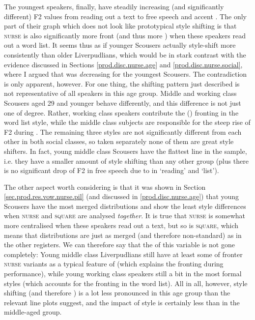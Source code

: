 The youngest speakers, finally, have steadily increasing (and significantly different) F2 values from reading out a text to free speech and accent .
The only part of their graph which does not look like prototypical style shifting is that \textsc{nurse} is also significantly more front (and thus more ) when these speakers read out a word list.
It seems thus as if younger Scousers actually style-shift more consistently than older Liverpudlians, which would be in stark contrast with the evidence discussed in Sections \ref{prod.disc.nurse.age} and \ref{prod.disc.nurse.social}, where I argued that  was \emph{de}creasing for the youngest Scousers.
The contradiction is only apparent, however.
For one thing, the shifting pattern just described is not representative of all speakers in this age group.
Middle and working class Scousers aged 29 and younger behave differently, and this difference is not just one of degree.
Rather, working class speakers contribute the () fronting in the word list style, while the middle class subjects are responsible for the steep rise of F2 during .
The remaining three styles are not significantly different from each other in both social classes, so taken separately none of them are great style shifters.
In fact, young middle class Scousers have the flattest line in the sample, i.e. they have a smaller amount of style shifting than any other group (plus there is no significant drop of F2 in free speech due to  in `reading' and `list').

The other aspect worth considering is that it was shown in Section \ref{sec.prod.res.vow.nurse.pil} (and discussed in \ref{prod.disc.nurse.age}) that young Scousers have the most merged distributions and show the least style differences when \textsc{nurse} and \textsc{square} are analysed \emph{together}.
It is true that \textsc{nurse} is somewhat more centralised when these speakers read out a text, but so is \textsc{square}, which means that  distributions are just as merged (and therefore non-standard) as in the other registers.
We can therefore say that the  of this variable is not gone completely:
Young middle class Liverpudlians still have at least some  of fronter \textsc{nurse} variants as a typical feature of  (which explains the fronting during performance), while young working class speakers still  a bit in the most formal styles (which accounts for the fronting in the word list).
All in all, however, style shifting (and therefore ) is a lot less pronounced in this age group than the relevant line plots suggest, and the impact of style is certainly less than in the middle-aged group.

